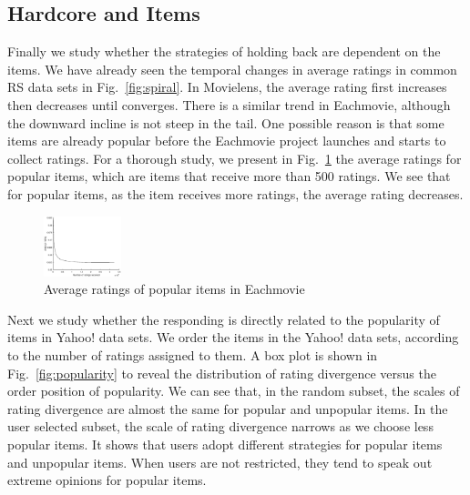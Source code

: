 \documentclass{sig-alternate}
\begin{document}
\subsection{Hardcore and Items}
Finally we study whether the strategies of holding back are dependent on the items. We have already seen the temporal changes in average ratings in common RS data sets in Fig.~\ref{fig:spiral}. In Movielens, the average rating first increases then decreases until converges. There is a similar trend in Eachmovie, although the downward incline is not steep in the tail. One possible reason is that some items are already popular before the Eachmovie project launches and starts to collect ratings. For a thorough study, we present in Fig.~\ref{fig:ratingpopulareachmovie} the average ratings for popular items, which are items that receive more than 500 ratings. We see that for popular items, as the item receives more ratings, the average rating decreases.

\begin{figure}[htbp]
\centering
\begin{center}
\includegraphics[width=0.2\textwidth]{fig8_eachmovie_popular.eps}
\caption{{Average ratings of popular items in Eachmovie}}
\label{fig:ratingpopulareachmovie}
\end{center}
\end{figure}

Next we study whether the responding is directly related to the popularity of items in Yahoo! data sets. We order the items in the Yahoo! data sets, according to the number of ratings assigned to them. A box plot is shown in Fig.~\ref{fig:popularity} to reveal the distribution of rating divergence versus the order position of popularity. We can see that, in the random subset, the scales of rating divergence are almost the same for popular and unpopular items. In the user selected subset, the scale of rating divergence narrows as we choose less popular items. It shows that users adopt different strategies for popular items and unpopular items. When users are  not restricted,  they tend to speak out extreme opinions for popular items.
\end{document}
